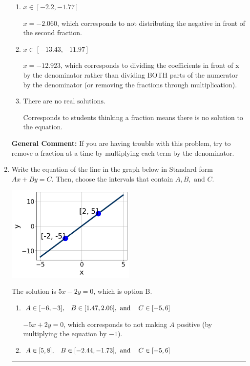 \documentclass{extbook}[14pt]
\newcommand{\litem}[1]{\item #1

\rule{\textwidth}{0.4pt}}
\begin{document}
\begin{enumerate}
{\begin{enumerate}[label=\Alph*.]
 $x = -0.391$, which corresponds to dividing the second number in the numerator by the denominator rather than dividing BOTH parts of the numerator by the denominator (or removing the fractions through multiplication).
\item \( x \in [-2.2, -1.77] \)

 $x = -2.060$, which corresponds to not distributing the negative in front of the second fraction.
\item \( x \in [-13.43, -11.97] \)

 $x = -12.923$, which corresponds to dividing the coefficients in front of x by the denominator rather than dividing BOTH parts of the numerator by the denominator (or removing the fractions through multiplication).
\item \( \text{There are no real solutions.} \)

Corresponds to students thinking a fraction means there is no solution to the equation.
\end{enumerate}

\textbf{General Comment:} If you are having trouble with this problem, try to remove a fraction at a time by multiplying each term by the denominator.
}
\litem{
Write the equation of the line in the graph below in Standard form $Ax+By=C$. Then, choose the intervals that contain $A, B, \text{ and } C$.

\begin{center}
    \includegraphics[width=0.5\textwidth]{../Figures/linearGraphToStandardA.png}
\end{center}



The solution is \( 5x - 2y = 0 \), which is option B.\begin{enumerate}[label=\Alph*.]
\item \( A \in [-6, -3], \hspace{3mm} B \in [1.47, 2.06], \text{ and } \hspace{3mm} C \in [-5, 6] \)

 $-5x + 2y = 0$, which corresponds to not making $A$ positive (by multiplying the equation by $-1$).
\item \( A \in [5, 8], \hspace{3mm} B \in [-2.44, -1.73], \text{ and } \hspace{3mm} C \in [-5, 6] \)


\end{enumerate}}
\end{enumerate}
\end{document}
